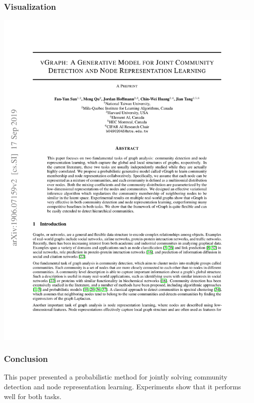 \documentclass[12pt,aspectratio=169]{beamer}
\begin{document}
    \begin{frame}
        \frametitle{Visualization}

        \centering
        \includegraphics[page=8,trim=2.5cm 18.5cm 2.5cm 2cm,clip,scale=.8]{vGraph.pdf}
    \end{frame}

    \appendix

    \begin{frame}
        \frametitle{Conclusion}

        This paper presented a probabilistic method for jointly solving community detection and node representation
        learning. Experiments show that it performs well for both tasks.
    \end{frame}

\end{document}

